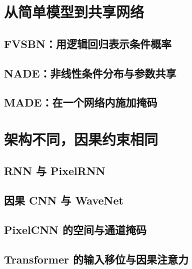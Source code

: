 \section{从简单模型到共享网络}
\label{sec:ar-shared-networks}
\contentplaceholder

\subsection{FVSBN：用逻辑回归表示条件概率}
\label{subsec:ar-fvsbn}
\contentplaceholder

\subsection{NADE：非线性条件分布与参数共享}
\label{subsec:ar-nade}
\contentplaceholder

\subsection{MADE：在一个网络内施加掩码}
\label{subsec:ar-made}
\contentplaceholder

\section{架构不同，因果约束相同}
\label{sec:ar-architectures}
\contentplaceholder

\subsection{RNN 与 PixelRNN}
\label{subsec:ar-rnn}
\contentplaceholder

\subsection{因果 CNN 与 WaveNet}
\label{subsec:ar-causal-cnn}
\contentplaceholder

\subsection{PixelCNN 的空间与通道掩码}
\label{subsec:ar-pixelcnn}
\contentplaceholder

\subsection{Transformer 的输入移位与因果注意力}
\label{subsec:ar-transformer}
\contentplaceholder

